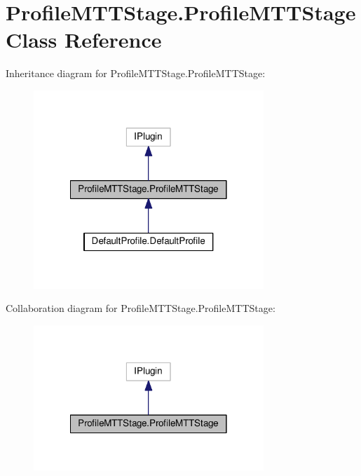 \hypertarget{classProfileMTTStage_1_1ProfileMTTStage}{\section{Profile\-M\-T\-T\-Stage.\-Profile\-M\-T\-T\-Stage Class Reference}
\label{classProfileMTTStage_1_1ProfileMTTStage}
}


Inheritance diagram for Profile\-M\-T\-T\-Stage.\-Profile\-M\-T\-T\-Stage\-:
\nopagebreak
\begin{figure}[H]
\begin{center}
\leavevmode
\includegraphics[width=246pt]{classProfileMTTStage_1_1ProfileMTTStage__inherit__graph}
\end{center}
\end{figure}


Collaboration diagram for Profile\-M\-T\-T\-Stage.\-Profile\-M\-T\-T\-Stage\-:
\nopagebreak
\begin{figure}[H]
\begin{center}
\leavevmode
\includegraphics[width=246pt]{classProfileMTTStage_1_1ProfileMTTStage__coll__graph}
\end{center}
\end{figure}
